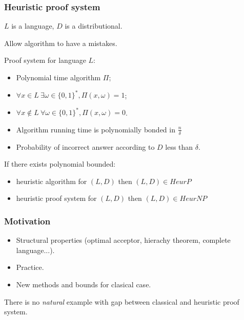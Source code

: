 \begin{frame}
    \frametitle{Heuristic proof system}

    $L$ is a language, $D$ is a distributional.

    Allow algorithm to have a mistakes.

    \begin{definition}
        Proof system for language $L$:
        \begin{itemize}
            \item Polynomial time algorithm $\Pi$;
            \item $\forall x \in L~ \exists \omega \in \{0, 1\}^{*}, \Pi(x, \omega) = 1$;
        	\item $\forall x \notin L~ \forall \omega \in \{0, 1\}^{*}, 
        		\Pi(x, \omega) = 0$.
        \end{itemize}
    \end{definition}
    \begin{itemize}
	    \item Algorithm running time is polynomially bonded in $\frac{n}{\delta}$
    	\item Probability of incorrect answer according to $D$ less than $\delta$.
    \end{itemize}
    
    If there exists polynomial bounded:
    \begin{itemize}
        \item heuristic algorithm for $(L, D)$ then $(L, D) \in HeurP$
	    \item heuristic proof system for $(L, D)$ then $(L, D) \in HeurNP$
    \end{itemize}
    
\end{frame}

\begin{frame}
    \frametitle{Motivation}

    \pause
    \begin{itemize}
	    \item Structural properties (optimal acceptor, hierachy theorem, complete
    		language...).
        \pause
    	\item Practice.
    	\pause
        \item New methods and bounds for clasical case.
    \end{itemize}

    \begin{statement}
        There is no {\it natural} example with gap between classical and heuristic proof system.
    \end{statement}
\end{frame}

